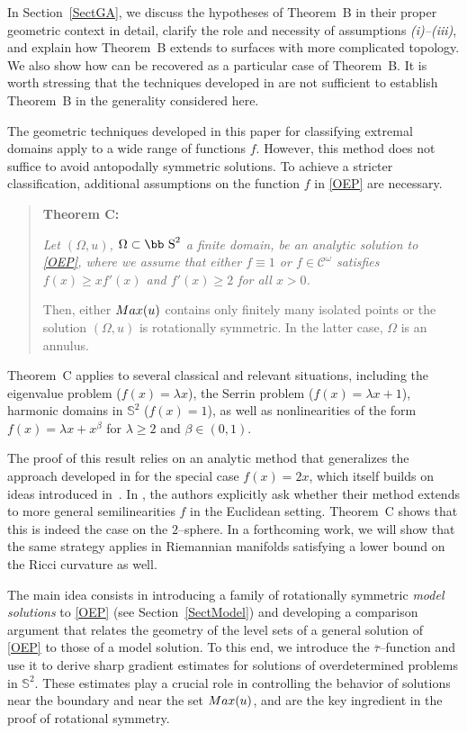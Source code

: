 \documentclass[11pt]{article}
\def\s{\hbox{\bb S}}
\newcommand{\Max}{\textup{Max}}
\numberwithin{equation} {section}
\begin{document}
In Section~\ref{SectGA}, we discuss the hypotheses of Theorem~B in their proper geometric context in detail, clarify the role and necessity of assumptions {\it (i)--(iii)}, and explain how Theorem~B extends to surfaces with more complicated topology. We also show how \cite[Theorem~B]{EMa} can be recovered as a particular case of Theorem~B. It is worth stressing that the techniques developed in \cite[Theorem~B]{EMa} are not sufficient to establish Theorem~B in the generality considered here.

The geometric techniques developed in this paper for classifying extremal domains apply to a wide range of functions \( f \). However, this method does not suffice to avoid antopodally symmetric solutions. To achieve a stricter classification, additional assumptions on the function \(f\) in \eqref{OEP} are necessary.
\begin{quote}
{\bf Theorem C:} {\it Let $(\Omega, u)$, $\Omega \subset \s ^2$ a finite domain, be an analytic solution to \eqref{OEP}, where we assume that either $f\equiv 1$ or $f\in\mathcal{C}^{\omega}$ satisfies $f(x)\geq x f'(x)$ and $f'(x)\geq 2$ for all $x>0$.

Then, either $\textup{Max}(u)$ contains only finitely many isolated points or the solution $(\Omega ,u)$ is rotationally symmetric. In the latter case, $\Omega$ is an annulus.
}
\end{quote}

Theorem~C applies to several classical and relevant situations, including the
eigenvalue problem ($f(x)=\lambda x$), the Serrin problem
($f(x)=\lambda x+1$), harmonic domains in $\mathbb{S}^2$ ($f(x)=1$), as well as
nonlinearities of the form $f(x)=\lambda x+x^\beta$ for $\lambda\ge2$ and
$\beta\in(0,1)$.

The proof of this result relies on an analytic method that generalizes the
approach developed in \cite{EMa} for the special case $f(x)=2x$, which itself builds on ideas introduced in~\cite{ABM}. In \cite[Section~1.5]{ABM}, the authors explicitly ask whether their method extends to more general semilinearities $f$ in the Euclidean setting.
Theorem~C shows that this is indeed the case on the $2$--sphere.
In a forthcoming work, we will show that the same strategy applies in Riemannian manifolds satisfying a lower bound on the Ricci curvature as well.

The main idea consists in introducing a family of rotationally symmetric {\it model solutions} to \eqref{OEP} (see Section~\ref{SectModel}) and developing a comparison argument that relates the geometry of the level sets of a general solution of \eqref{OEP} to those of a model solution.  To this end, we introduce the $\overline{\tau}$--function and use it to derive sharp gradient estimates for solutions of overdetermined problems in $\mathbb{S}^2$. 
These estimates play a crucial role in controlling the behavior of solutions near the boundary and near the set $\Max(u)$, and are the key ingredient in the proof of rotational symmetry.
\end{document}
